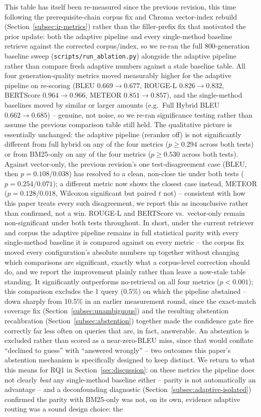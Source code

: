 \documentclass[a4paper,twoside]{article}
\begin{document}
This table has itself been re-measured since the previous revision, this time following the prerequisite-chain corpus fix and Chroma vector-index rebuild (Section~\ref{subsec:ir-metrics}) rather than the filler-prefix fix that motivated the prior update: both the adaptive pipeline and every single-method baseline retrieve against the corrected corpus/index, so we re-ran the full 800-generation baseline sweep (\texttt{scripts/run\_ablation.py}) alongside the adaptive pipeline rather than compare fresh adaptive numbers against a stale baseline table. All four generation-quality metrics moved measurably higher for the adaptive pipeline on re-scoring (BLEU $0.669\to0.677$, ROUGE-L $0.826\to0.832$, BERTScore $0.964\to0.966$, METEOR $0.851\to0.857$), and the single-method baselines moved by similar or larger amounts (e.g.\ Full Hybrid BLEU $0.662\to0.685$) -- genuine, not noise, so we re-ran significance testing rather than assume the previous comparison table still held. The qualitative picture is essentially unchanged: the adaptive pipeline (reranker off) is not significantly different from full hybrid on any of the four metrics ($p\geq0.294$ across both tests) or from BM25-only on any of the four metrics ($p\geq0.530$ across both tests). Against vector-only, the previous revision's one test-disagreement case (BLEU, then $p=0.108$/$0.038$) has resolved to a clean, non-close tie under both tests ($p=0.254$/$0.071$); a different metric now shows the closest case instead, METEOR ($p=0.128$/$\mathbf{0.018}$, Wilcoxon significant but paired $t$ not) -- consistent with how this paper treats every such disagreement, we report this as inconclusive rather than confirmed, not a win. ROUGE-L and BERTScore vs.\ vector-only remain non-significant under both tests throughout. In short, under the current retriever and corpus the adaptive pipeline remains in full statistical parity with every single-method baseline it is compared against on every metric -- the corpus fix moved every configuration's absolute numbers up together without changing which comparisons are significant, exactly what a corpus-level correction should do, and we report the improvement plainly rather than leave a now-stale table standing. It significantly outperforms no-retrieval on all four metrics ($p<0.001$); this comparison excludes the 1 query (0.5\%) on which the pipeline abstained -- down sharply from 10.5\% in an earlier measurement round, since the exact-match coverage fix (Section~\ref{subsec:unambiguous}) and the resulting abstention recalibration (Section~\ref{subsec:abstention}) together made the confidence gate fire correctly far less often on queries that are, in fact, answerable. An abstention is excluded rather than scored as a near-zero-BLEU miss, since that would conflate ``declined to guess'' with ``answered wrongly'' -- two outcomes this paper's abstention mechanism is specifically designed to keep distinct. We return to what this means for RQ1 in Section~\ref{sec:discussion}: on these metrics the pipeline does not clearly \emph{beat} any single-method baseline either -- parity is not automatically an advantage -- and a deconfounding diagnostic (Section~\ref{subsec:adaptive-isolated}) confirmed the parity with BM25-only was not, on its own, evidence adaptive routing was a sound design choice: the 
\end{document}
